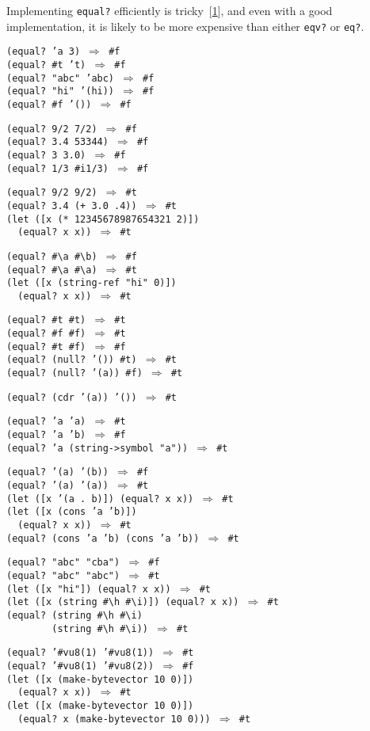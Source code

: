Implementing \texttt{equal?} efficiently is tricky [\hyperref[bibliography_g219]{1}], and
even with a good implementation, it is likely to be more expensive than
either \texttt{eqv?} or \texttt{eq?}.


\begin{alltt}
(equal? 'a 3) \(\Rightarrow\) \#{}f
(equal? \#{}t 't) \(\Rightarrow\) \#{}f
(equal? "abc" 'abc) \(\Rightarrow\) \#{}f
(equal? "hi" '(hi)) \(\Rightarrow\) \#{}f
(equal? \#{}f '()) \(\Rightarrow\) \#{}f

(equal? 9/2 7/2) \(\Rightarrow\) \#{}f
(equal? 3.4 53344) \(\Rightarrow\) \#{}f
(equal? 3 3.0) \(\Rightarrow\) \#{}f
(equal? 1/3 \#{}i1/3) \(\Rightarrow\) \#{}f

(equal? 9/2 9/2) \(\Rightarrow\) \#{}t
(equal? 3.4 (+ 3.0 .4)) \(\Rightarrow\) \#{}t
(let ([x (* 12345678987654321 2)])
  (equal? x x)) \(\Rightarrow\) \#{}t

(equal? \#{}\textbackslash{}a \#{}\textbackslash{}b) \(\Rightarrow\) \#{}f
(equal? \#{}\textbackslash{}a \#{}\textbackslash{}a) \(\Rightarrow\) \#{}t
(let ([x (string-ref "hi" 0)])
  (equal? x x)) \(\Rightarrow\) \#{}t

(equal? \#{}t \#{}t) \(\Rightarrow\) \#{}t
(equal? \#{}f \#{}f) \(\Rightarrow\) \#{}t
(equal? \#{}t \#{}f) \(\Rightarrow\) \#{}f
(equal? (null? '()) \#{}t) \(\Rightarrow\) \#{}t
(equal? (null? '(a)) \#{}f) \(\Rightarrow\) \#{}t

(equal? (cdr '(a)) '()) \(\Rightarrow\) \#{}t

(equal? 'a 'a) \(\Rightarrow\) \#{}t
(equal? 'a 'b) \(\Rightarrow\) \#{}f
(equal? 'a (string-\textgreater{}symbol "a")) \(\Rightarrow\) \#{}t

(equal? '(a) '(b)) \(\Rightarrow\) \#{}f
(equal? '(a) '(a)) \(\Rightarrow\) \#{}t
(let ([x '(a . b)]) (equal? x x)) \(\Rightarrow\) \#{}t
(let ([x (cons 'a 'b)])
  (equal? x x)) \(\Rightarrow\) \#{}t
(equal? (cons 'a 'b) (cons 'a 'b)) \(\Rightarrow\) \#{}t

(equal? "abc" "cba") \(\Rightarrow\) \#{}f
(equal? "abc" "abc") \(\Rightarrow\) \#{}t
(let ([x "hi"]) (equal? x x)) \(\Rightarrow\) \#{}t
(let ([x (string \#{}\textbackslash{}h \#{}\textbackslash{}i)]) (equal? x x)) \(\Rightarrow\) \#{}t
(equal? (string \#{}\textbackslash{}h \#{}\textbackslash{}i)
        (string \#{}\textbackslash{}h \#{}\textbackslash{}i)) \(\Rightarrow\) \#{}t

(equal? '\#{}vu8(1) '\#{}vu8(1)) \(\Rightarrow\) \#{}t
(equal? '\#{}vu8(1) '\#{}vu8(2)) \(\Rightarrow\) \#{}f
(let ([x (make-bytevector 10 0)])
  (equal? x x)) \(\Rightarrow\) \#{}t
(let ([x (make-bytevector 10 0)])
  (equal? x (make-bytevector 10 0))) \(\Rightarrow\) \#{}t


\end{alltt}
